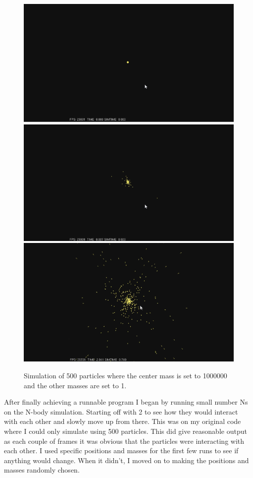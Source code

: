 \documentclass{egpubl}
\begin{document}
\begin{figure}[H]
  \centering
  \includegraphics[width=.8\linewidth]{Screen_Caps/500ptk_1000000_and_1_1.png}
  \includegraphics[width=.8\linewidth]{Screen_Caps/500ptk_1000000_and_1_2.png}
  \includegraphics[width=.8\linewidth]{Screen_Caps/500ptk_1000000_and_1_3.png}
  \caption{\label{fig:Fig2}
           Simulation of 500 particles where the center mass is set to 1000000 and the other masses are set to 1.}
\end{figure}

    After finally achieving a runnable program I began by running small number Ns on the N-body simulation. Starting off with 2 to see how they would interact with each other and slowly move up from there. This was on my original code where I could only simulate using 500 particles. This did give reasonable output as each couple of frames it was obvious that the particles were interacting with each other. I used specific positions and masses for the first few runs to see if anything would change. When it didn’t, I moved on to making the positions and masses randomly chosen.
\end{document}
